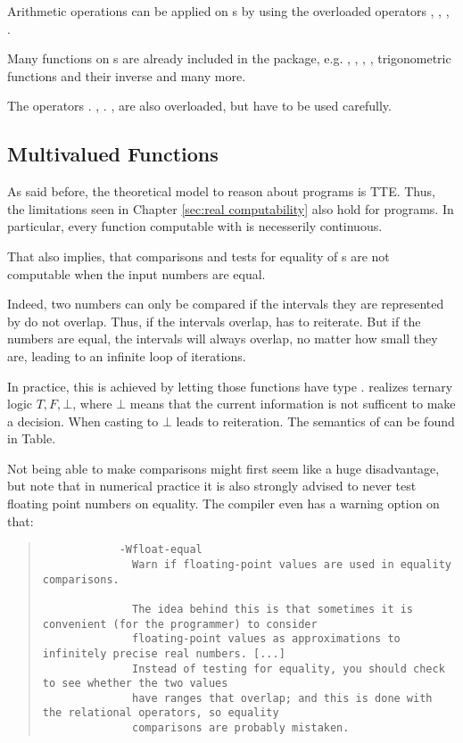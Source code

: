 		Arithmetic operations can be applied on \real s by using the overloaded operators \code{+}, \code{-}, \code{*},
		\code{/}.

		Many functions on \real s are already included in the \irram package, e.g. 
		, , , ,
		trigonometric functions and their inverse and many more.

		The operators \code{<}. \code{<=}, \code{==}. \code{>=}, \code{>} are also overloaded, but have to be used carefully.


	\subsection{Multivalued Functions}
		As said before, the theoretical model to reason about \irram programs is TTE.
		Thus, the limitations seen in Chapter \ref{sec:real computability} also hold for \irram programs.  
		In particular, every function computable with \irram is necesserily continuous.
		
		That also implies, that comparisons and tests for equality of {\real}s are not computable when the input numbers are equal.

		Indeed, two numbers can only be compared if the intervals they are represented by do not overlap. 
		Thus, if the intervals overlap, \irram has to reiterate. But if the numbers are equal, the intervals will always overlap, 
		no matter how small they are, leading to an infinite loop of iterations.
		
		In practice, this is achieved by letting those functions have type .
 		 realizes ternary logic
		$T, F,\bot$, where $\bot$ means that the current information is not sufficent to make a decision.
		When casting to  $\bot$ leads to reiteration. The semantics of  can be found in Table.

		Not being able to make comparisons might first seem like a huge disadvantage, but note that in numerical practice it is also strongly advised to never test floating point numbers on equality.
		The  compiler even has a warning option on that:
		\begin{quotation}
				\noindent
		\begin{verbatim}
			-Wfloat-equal
			  Warn if floating-point values are used in equality comparisons.

			  The idea behind this is that sometimes it is convenient (for the programmer) to consider 
			  floating-point values as approximations to infinitely precise real numbers. [...]
			  Instead of testing for equality, you should check to see whether the two values 
			  have ranges that overlap; and this is done with the relational operators, so equality 
			  comparisons are probably mistaken. 
		    \end{verbatim}
		\end{quotation} 

